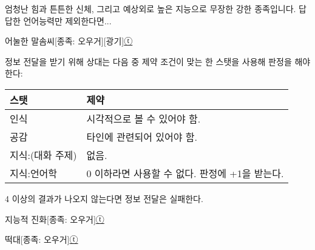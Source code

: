 \documentclass{report}
\begin{document}
	엄청난 힘과 튼튼한 신체, 그리고 예상외로 높은 지능으로 무장한 강한 종족입니다. 답답한 언어능력만 제외한다면...
	
	\begin{story}{어눌한 말솜씨}{[종족: 오우거][광기]\hyperlink{celesteela}{ⓣ}}
		{정보 전달을 받기 위해 상대는 다음 중 제약 조건이 맞는 한 스탯을 사용해 판정을 해야한다:
			
			\begin{tightcenter}
				\begin{tabular}{l!{\color{black}\vrule}l}
					\textbf{스탯}    & \textbf{제약}                                  \\\hline\hline
					인식             & 시각적으로 볼 수 있어야 함.                    \\\hline
					공감             & 타인에 관련되어 있어야 함.                     \\\hline
					지식:(대화 주제) & 없음.                                          \\\hline
					지식:언어학      & 0 이하라면 사용할 수 없다. 판정에 +1을 받는다.
				\end{tabular}
			\end{tightcenter}
			
			4 이상의 결과가 나오지 않는다면 정보 전달은 실패한다.}
		
		
	\end{story}
	
	\begin{story}{지능적 진화}{[종족: 오우거]\hyperlink{celesteela}{ⓣ}}
		
	\end{story}
	
	\begin{story}{떡대}{[종족: 오우거]\hyperlink{celesteela}{ⓣ}}
		
		
		
	\end{story}
\end{document}
